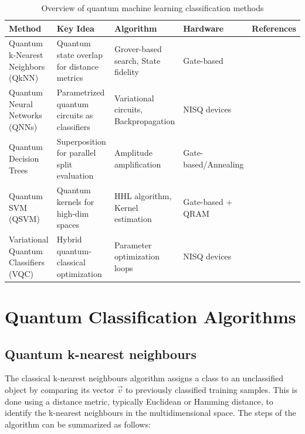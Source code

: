 \documentclass{article}
\begin{document}
\begin{table}[ht]
  \centering
  \scriptsize  %
  \caption{Overview of quantum machine learning classification methods}
  \label{tab:qml_methods}
  \begin{tabular}{@{}>{\RaggedRight}p{2.5cm}>{\RaggedRight}p{3cm}>{\RaggedRight}p{3cm}>{\RaggedRight}p{2cm}>{\RaggedRight}p{2cm}@{}}
  \toprule
  \textbf{Method} & \textbf{Key Idea} & \textbf{Algorithm} & \textbf{Hardware} & \textbf{References}\\
  \midrule
  Quantum k-Nearest Neighbors (QkNN) & 
  Quantum state overlap for distance metrics & 
  Grover-based search, State fidelity & 
  Gate-based & \\ 
  \addlinespace
  
  Quantum Neural Networks (QNNs) & 
  Parametrized quantum circuits as classifiers & 
  Variational circuits, Backpropagation & 
  NISQ devices & \\ 
  \addlinespace
  
  Quantum Decision Trees & 
  Superposition for parallel split evaluation & 
  Amplitude amplification & 
  Gate-based/Annealing &
  \\ 
  \addlinespace
  
  Quantum SVM (QSVM) & 
  Quantum kernels for high-dim spaces & 
  HHL algorithm, Kernel estimation & 
  Gate-based + QRAM & 
  \\ 
  \addlinespace
  
  Variational Quantum Classifiers (VQC) & 
  Hybrid quantum-classical optimization & 
  Parameter optimization loops & 
  NISQ devices &
  \\ 
  \bottomrule
  \end{tabular}
  \end{table}

\section*{Quantum Classification Algorithms}
\subsection*{Quantum k-nearest neighbours}
The classical k-nearest neighbours algorithm assigns a class to an unclassified object by comparing its vector $\vec{v}$ to previously classified training samples. This is done using a distance metric, typically Euclidean or Hamming distance, to identify the k-nearest neighbours in the multidimensional space. The steps of the algorithm can be summarized as follows:
\end{document}
